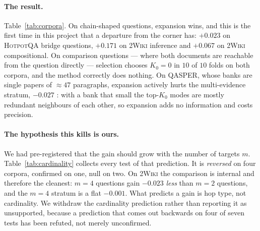 \paragraph{The result.} Table~\ref{tab:corpora}. On chain-shaped questions, expansion wins,
and this is the first time in this project that a departure from the corner has: $+0.023$
 on \textsc{HotpotQA} bridge questions, $+0.171$  on
\textsc{2Wiki} inference and $+0.067$  on \textsc{2Wiki} compositional.
On comparison questions --- where both documents are reachable from the question directly
--- selection chooses $K_0{=}0$ in $10$ of $10$ folds on both corpora, and the method
correctly does nothing. On \textsc{QASPER}, whose banks are single papers of ${\approx}47$
paragraphs, expansion actively hurts the multi-evidence stratum, $-0.027$
: with a bank that small the top-$K_0$ modes are mostly redundant
neighbours of each other, so expansion adds no information and costs precision.

\paragraph{The hypothesis this kills is ours.} We had pre-registered that the gain should
grow with the number of targets $m$. Table~\ref{tab:cardinality} collects every test of
that prediction. It is \emph{reversed} on four corpora, confirmed on one, null on two. On
\textsc{2Wiki} the comparison is internal and therefore the cleanest: $m{=}4$ questions gain
$-0.023$  \emph{less} than $m{=}2$ questions, and the $m{=}4$ stratum is
a flat $-0.001$. What predicts a gain is hop type, not cardinality. We withdraw the
cardinality prediction rather than reporting it as unsupported, because a prediction that
comes out backwards on four of seven tests has been refuted, not merely unconfirmed.

\begin{table}[t]\centering\small
\caption{Every pre-registered test of our own prediction that more targets should make
expansion help more. Four reversals, one confirmation, two nulls. Two rows rest on a
$23$-query stratum (\textsc{SciFact} multi-relevant, \textsc{NFCorpus} single-relevant) and
should be read as weak in both directions; \textsc{NFCorpus}, the one confirmation, is one
of them. The mosaic row is exactly zero because the method selected $K_0{=}0$ in $10/10$
folds at every $m$, so the interaction is zero by construction.}
\label{tab:cardinality}

\end{table}

